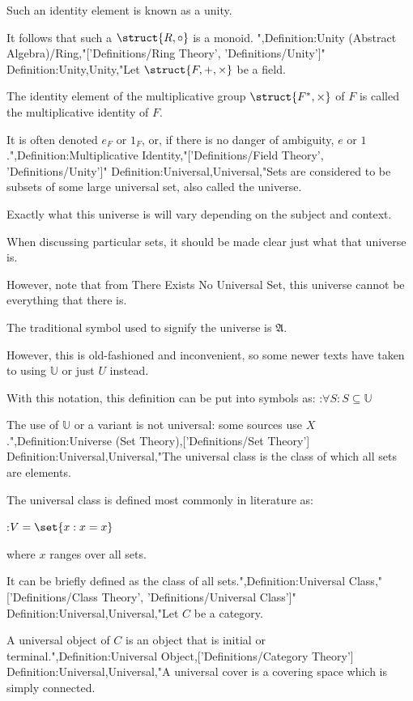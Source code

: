 Such an identity element is known as a unity.


It follows that such a $\struct {R, \circ}$ is a monoid.
",Definition:Unity (Abstract Algebra)/Ring,"['Definitions/Ring Theory', 'Definitions/Unity']"
Definition:Unity,Unity,"Let $\struct {F, +, \times}$ be a field.

The identity element of the multiplicative group $\struct {F^*, \times}$ of $F$ is called the multiplicative identity of $F$.

It is often denoted $e_F$ or $1_F$, or, if there is no danger of ambiguity, $e$ or $1$.",Definition:Multiplicative Identity,"['Definitions/Field Theory', 'Definitions/Unity']"
Definition:Universal,Universal,"Sets are considered to be subsets of some large universal set, also called the universe.

Exactly what this universe is will vary depending on the subject and context.

When discussing particular sets, it should be made clear just what that universe is.

However, note that from There Exists No Universal Set, this universe cannot be everything that there is.


The traditional symbol used to signify the universe is $\mathfrak A$.

However, this is old-fashioned and inconvenient, so some newer texts have taken to using $\mathbb U$ or just $U$ instead.


With this notation, this definition can be put into symbols as:
:$\forall S: S \subseteq \mathbb U$


The use of $\mathbb U$ or a variant is not universal: some sources use $X$.",Definition:Universe (Set Theory),['Definitions/Set Theory']
Definition:Universal,Universal,"The universal class is the class of which all sets are elements.


The universal class is defined most commonly in literature as:

:$V = \set {x: x = x}$

where $x$ ranges over all sets.


It can be briefly defined as the class of all sets.",Definition:Universal Class,"['Definitions/Class Theory', 'Definitions/Universal Class']"
Definition:Universal,Universal,"Let $C$ be a category.


A universal object of $C$ is an object that is initial or terminal.",Definition:Universal Object,['Definitions/Category Theory']
Definition:Universal,Universal,"A universal cover is a covering space which is simply connected.



